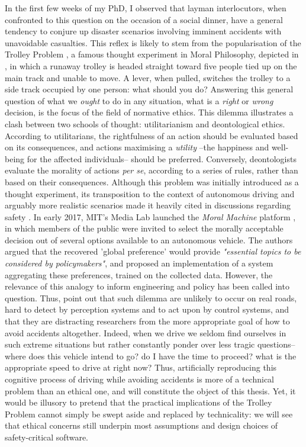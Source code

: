 In the first few weeks of my PhD, I observed that layman interlocutors, when confronted to this question on the occasion of a social dinner, have a general tendency to conjure up disaster scenarios involving imminent accidents with unavoidable casualties. This reflex is likely to stem from the popularisation of the Trolley Problem \citep{Foot1967}, a famous thought experiment in Moral Philosophy, depicted in , in which a runaway trolley is headed straight toward five people tied up on the main track and unable to move. A lever, when pulled, switches the trolley to a side track occupied by one person: what should you do? Answering this general question of what we \emph{ought} to do in any situation, what is a \emph{right} or \emph{wrong} decision, is the focus of the field of {normative ethics}. This dilemma illustrates a clash between two schools of thought: utilitarianism and deontological ethics. According to utilitarians, the rightfulness of an action should be evaluated based on its consequences, and actions maximising a \emph{utility} --the happiness and well-being for the affected individuals-- should be preferred. Conversely, deontologists evaluate the morality of actions \emph{per se}, according to a series of rules, rather than based on their consequences. Although this problem was initially introduced as a thought experiment, its transposition to the context of autonomous driving and arguably more realistic scenarios made it heavily cited in discussions regarding safety \citep[e.g.]{Lin2015,Bonnefon2016,Gogoll2017}. In early 2017, MIT’s Media Lab launched the \emph{Moral Machine} platform \citep{Awad2018}, in which members of the public were invited to select the morally acceptable decision out of several options available to an autonomous vehicle. The authors argued that the recovered 'global preference' would provide \emph{"essential topics to be considered by policymakers"}, and \citep{Noothigattu2018} proposed an implementation of a system aggregating these preferences, trained on the collected data. However, the relevance of this analogy to inform engineering and policy has been called into question. Thus, \citep{DeFreitas2019} point out that such dilemma are unlikely to occur on real roads, hard to detect by perception systems and to act upon by control systems, and that they are distracting researchers from the more appropriate goal of how to avoid accidents altogether. Indeed, when we drive we seldom find ourselves in such extreme situations but rather constantly ponder over less tragic questions-- where does this vehicle intend to go? do I have the time to proceed? what is the appropriate speed to drive at right now? Thus, artificially reproducing this cognitive process of driving while avoiding accidents is more of a technical problem than an ethical one, and will constitute the object of this thesis. Yet, it would be illusory to pretend that the practical implications of the Trolley Problem cannot simply be swept aside and replaced by technicality: we will see that ethical concerns still underpin most assumptions and design choices of safety-critical software.

